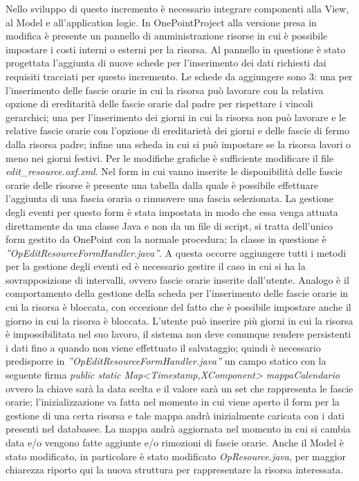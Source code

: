 Nello sviluppo di questo incremento \`{e} necessario integrare componenti alla View, al Model e all\textquoteright{}application logic.
In OnePointProject alla versione presa in modifica \`{e} presente un pannello di amministrazione risorse in cui \`{e} possibile impostare i costi interni o esterni per la risorsa. Al pannello in questione \`{e} stato progettata l\textquoteright{}aggiunta di nuove schede per l\textquoteright{}inserimento dei dati richiesti dai requisiti tracciati per questo incremento. Le schede da aggiungere sono 3: una per l\textquoteright{}inserimento delle fascie orarie in cui la risorsa pu\`{o} lavorare con la relativa opzione di ereditarit\`{a} delle fascie orarie dal padre per rispettare i vincoli gerarchici; una per l\textquoteright{}inserimento dei giorni in cui la risorsa non pu\`{o} lavorare e le relative fascie orarie con l\textquoteright{}opzione di ereditariet\`{a} dei giorni e delle fascie di fermo dalla risorsa padre; infine una scheda in cui si pu\`{o} impostare se la risorsa lavori o meno nei giorni festivi. Per le modifiche grafiche \`{e} sufficiente modificare il file \textit{edit\_resource.oxf.xml}.
Nel form in cui vanno inserite le disponibilit\`{a} delle fascie orarie delle risorse \`{e} presente una tabella dalla quale \`{e} possibile effettuare l\textquoteright{}aggiunta di una fascia oraria o rimuovere una fascia selezionata. La gestione degli eventi per questo form \`{e} stata impostata in modo che essa venga attuata direttamente da una classe Java e non da un file di script, si tratta dell\textquoteright{}unico form gestito da OnePoint con la normale procedura; la classe in questione \`{e} \textit{''OpEditResourceFormHandler.java''}. A questa occorre aggiungere tutti i metodi per la gestione degli eventi ed \`{e} necessario gestire il caso in cui si ha la sovrapposizione di intervalli, ovvero fascie orarie inserite dall\textquoteright{}utente. Analogo \`{e} il comportamento della gestione della scheda per l\textquoteright{}inserimento delle fascie orarie in cui la risorsa \`{e} bloccata, con eccezione del fatto che \`{e} possibile impostare anche il giorno in cui la risorsa \`{e} bloccata. L\textquoteright{}utente pu\`{o} inserire pi\`{u} giorni in cui la risorsa \`{e} impossibilitata nel suo lavoro, il sistema non deve comunque rendere persistenti i dati fino a quando non viene effettuato il salvataggio; quindi \`{e} necessario predisporre in \textit{''OpEditResourceFormHandler.java''} un campo statico con la seguente firma \textit{public static Map<Timestamp,XComponent> mappaCalendario} ovvero la chiave sar\`{a} la data scelta e il valore sar\`{a} un set che rappresenta le fascie orarie; l\textquoteright{}inizializzazione va fatta nel momento in cui viene aperto il form per la gestione di una certa risorsa e tale mappa andr\`{a} inizialmente caricata con i dati presenti nel databasee. La mappa andr\`{a} aggiornata nel momento in cui si cambia data e/o vengono fatte aggiunte e/o rimozioni di fascie orarie. Anche il Model \`{e} stato modificato, in particolare \`{e} stato modificato \textit{OpResource.java}, per maggior chiarezza riporto qui la nuova struttura per rappresentare la risorsa interessata.

